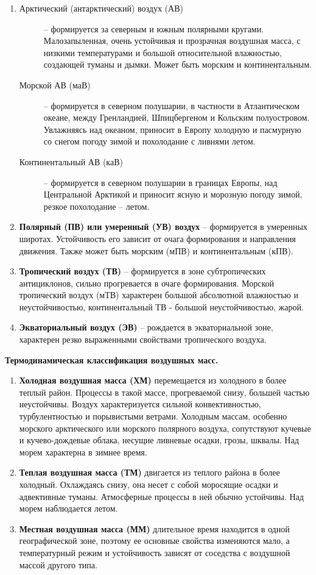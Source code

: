 \documentclass[a4paper, 12pt, twoside, final, book, russian, fittopage, cyremdash]{ncc}
\begin{document}
\begin{enumerate}
\item \begin{description}
  \item[Арктический (антарктический) воздух (АВ)] \--- формируется за северным и южным полярными кругами. Малозапыленная, очень устойчивая и прозрачная воздушная масса, с низкими температурами и большой относительной влажностью, создающей туманы и дымки. Может быть морским и континентальным.
  \item[Морской АВ (маВ)] \--- формируется в северном полушарии, в частности в Атлантическом океане, между Гренландией, Шпицбергеном и Кольским полуостровом. Увлажняясь над океаном, приносит в Европу холодную и пасмурную со снегом погоду зимой и похолодание с ливнями летом.
  \item[Континентальный АВ (каВ)] \--- формируется в северном полушарии в границах Европы, над Центральной Арктикой и приносит ясную и морозную погоду зимой, резкое похолодание \--- летом.
  \end{description}
\item \textbf{Полярный (ПВ) или умеренный (УВ) воздух} \--- формируется в умеренных широтах. Устойчивость его зависит от очага формирования и направления движения. Также может быть морским (мПВ) и континентальным (кПВ).
\item \textbf{Тропический воздух (ТВ)} \--- формируется в зоне субтропических антициклонов, сильно прогревается в очаге формирования. Морской тропический воздух (мТВ) характерен большой абсолютной влажностью и неустойчивостью, континентальный ТВ - большой неустойчивостью, жарой.
\item \textbf{Экваториальный воздух (ЭВ)} \--- рождается в экваториальной зоне, характерен резко выраженными свойствами тропического воздуха.
\end{enumerate}

\textbf{Термодинамическая классификация воздушных масс.}
\begin{enumerate}
\item \textbf{Холодная воздушная масса (ХМ)} перемещается из холодного в более теплый район. Процессы в такой массе, прогреваемой снизу, большей частью неустойчивы. Воздух характеризуется сильной конвективностью, турбулентностью и порывистыми ветрами. Холодным массам, особенно морского арктического или морского полярного воздуха, сопутствуют кучевые и кучево-дождевые облака, несущие ливневые осадки, грозы, шквалы. Над морем характерна в зимнее время.
\item \textbf{Теплая воздушная масса (ТМ)} двигается из теплого района в более холодный. Охлаждаясь снизу, она несет с собой моросящие осадки и адвективные туманы. Атмосферные процессы в ней обычно устойчивы. Над морем наблюдается летом.
\item \textbf{Местная воздушная масса (ММ)} длительное время находится в одной географической зоне, поэтому ее основные свойства изменяются мало, а температурный режим и устойчивость зависят от соседства с воздушной массой другого типа.
\end{enumerate}
\end{document}
